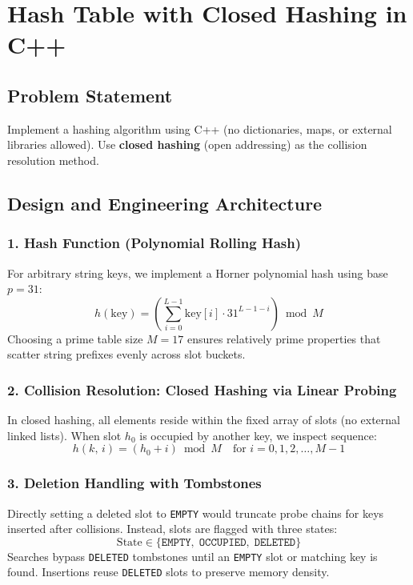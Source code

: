 \documentclass[12pt,a4paper]{article}
\theoremstyle{plain}
\theoremstyle{definition}
\theoremstyle{remark}
\begin{document}
\newpage
\section{Hash Table with Closed Hashing in C++}

\subsection{Problem Statement}
Implement a hashing algorithm using C++ (no dictionaries, maps, or external libraries allowed). Use \textbf{closed hashing} (open addressing) as the collision resolution method.

\subsection{Design and Engineering Architecture}

\subsubsection*{1. Hash Function (Polynomial Rolling Hash)}
For arbitrary string keys, we implement a Horner polynomial hash using base $p = 31$:
\[
  h(\text{key}) = \left(\sum_{i=0}^{L-1} \text{key}[i] \cdot 31^{L-1-i}\right) \bmod M
\]
Choosing a prime table size $M = 17$ ensures relatively prime properties that scatter string prefixes evenly across slot buckets.

\subsubsection*{2. Collision Resolution: Closed Hashing via Linear Probing}
In closed hashing, all elements reside within the fixed array of slots (no external linked lists). When slot $h_0$ is occupied by another key, we inspect sequence:
\[
  h(k,\, i) = (h_0 + i) \bmod M \quad \text{for } i = 0, 1, 2, \dots, M-1
\]

\subsubsection*{3. Deletion Handling with Tombstones}
Directly setting a deleted slot to \texttt{EMPTY} would truncate probe chains for keys inserted after collisions. Instead, slots are flagged with three states:
\[
  \text{State} \in \{\texttt{EMPTY},\; \texttt{OCCUPIED},\; \texttt{DELETED}\}
\]
Searches bypass \texttt{DELETED} tombstones until an \texttt{EMPTY} slot or matching key is found. Insertions reuse \texttt{DELETED} slots to preserve memory density.
\end{document}
